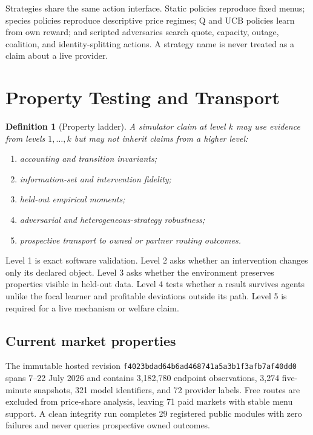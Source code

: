 \documentclass[10pt]{article}
\newtheorem{definition}{Definition}
\newcommand{\1}{\mathbf 1}
\begin{document}
Strategies share the same action interface.  Static policies reproduce fixed
menus; species policies reproduce descriptive price regimes; Q and UCB policies
learn from own reward; and scripted adversaries search quote, capacity, outage,
coalition, and identity-splitting actions.  A strategy name is never treated as a
claim about a live provider.

\section{Property Testing and Transport}
\label{sec:properties}

\begin{definition}[Property ladder]
A simulator claim at level $k$ may use evidence from levels $1,\ldots,k$ but may
not inherit claims from a higher level:
\begin{enumerate}
\item accounting and transition invariants;
\item information-set and intervention fidelity;
\item held-out empirical moments;
\item adversarial and heterogeneous-strategy robustness;
\item prospective transport to owned or partner routing outcomes.
\end{enumerate}
\end{definition}

Level 1 is exact software validation.  Level 2 asks whether an intervention
changes only its declared object.  Level 3 asks whether the environment preserves
properties visible in held-out data.  Level 4 tests whether a result survives
agents unlike the focal learner and profitable deviations outside its path.
Level 5 is required for a live mechanism or welfare claim.

\subsection{Current market properties}

The immutable hosted revision
\texttt{f4023bdad64b6ad468741a5a3b1f3afb7af40dd0} spans 7--22 July 2026 and
contains 3,182,780 endpoint observations, 3,274 five-minute snapshots, 321 model
identifiers, and 72 provider labels.  Free routes are excluded from price-share
analysis, leaving 71 paid markets with stable menu support.  A clean integrity
run completes 29 registered public modules with zero failures and never queries
prospective owned outcomes.
\end{document}

